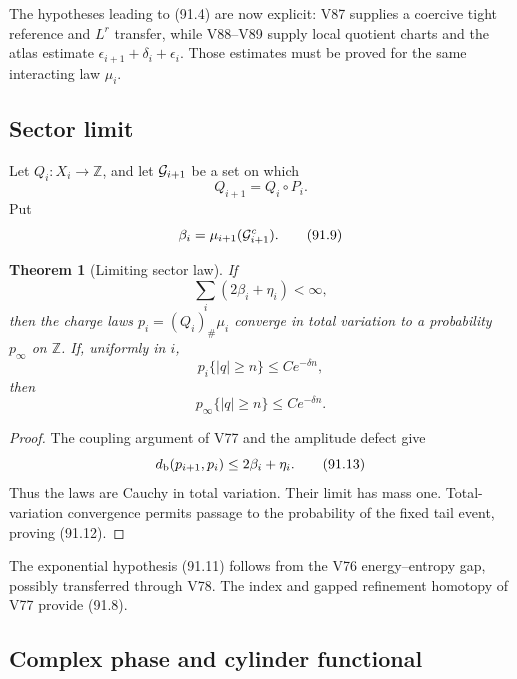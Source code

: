 \documentclass[11pt]{article}
\newtheorem{theorem}{Theorem}[section]
\begin{document}
The hypotheses leading to (91.4) are now explicit: V87 supplies a
coercive tight reference and \(L^r\) transfer, while V88--V89 supply
local quotient charts and the atlas estimate
\(\epsilon_{i+1}+\delta_i+\epsilon_i\).  Those estimates must be
proved for the same interacting law \(\mu_i\).

\subsection{Sector limit}

Let \(Q_i:X_i\to\mathbb Z\), and let
\({\cal G}_{i+1}\) be a set on which
\[
                              Q_{i+1}=Q_i\circ P_i.           \tag{91.8}
\]
Put
\[
                              \beta_i=\mu_{i+1}({\cal G}_{i+1}^c).
                                                                    \tag{91.9}
\]

\begin{theorem}[Limiting sector law]
\label{thm:v11v91-sector}
If
\[
                              \sum_i(2\beta_i+\eta_i)<\infty, \tag{91.10}
\]
then the charge laws \(p_i=(Q_i)_\#\mu_i\) converge in total variation
to a probability \(p_\infty\) on \(\mathbb Z\).  If, uniformly in
\(i\),
\[
                              p_i\{|q|\ge n\}\le Ce^{-\delta n},
                                                                    \tag{91.11}
\]
then
\[
                              p_\infty\{|q|\ge n\}\le Ce^{-\delta n}.
                                                                    \tag{91.12}
\]
\end{theorem}

\begin{proof}
The coupling argument of V77 and the amplitude defect give
\[
                              d_{\rm b}(p_{i+1},p_i)
                              \le2\beta_i+\eta_i.             \tag{91.13}
\]
Thus the laws are Cauchy in total variation.  Their limit has mass
one.  Total-variation convergence permits passage to the probability
of the fixed tail event, proving (91.12).
\end{proof}

The exponential hypothesis (91.11) follows from the V76
energy--entropy gap, possibly transferred through V78.  The index and
gapped refinement homotopy of V77 provide (91.8).

\subsection{Complex phase and cylinder functional}
\end{document}
